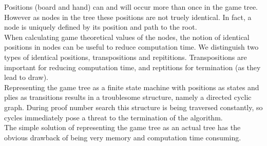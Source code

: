 \documentclass{article}
\begin{document}
Positions (board and hand) can and will occur more than once in the game tree. However as nodes in the tree these positions are not truely identical. In fact, a node is uniquely defined by its position and path to the root.\\
When calculating game theoretical values of the nodes, the notion of identical positions in nodes can be useful to reduce computation time. We distinguish two types of identical positions, transpositions and repititions. Transpositions are important for reducing computation time, and reptitions for termination (as they lead to draw).\\
Representing the game tree as a finite state machine with positions as states and plies as transitions results in a troublesome structure, namely a directed cyclic graph. During proof number search this structure is being traversed constantly, so cycles immediately pose a threat to the termination of the algorithm.\\
The simple solution of representing the game tree as an actual tree has the obvious drawback of being very memory and computation time consuming.
\end{document}
